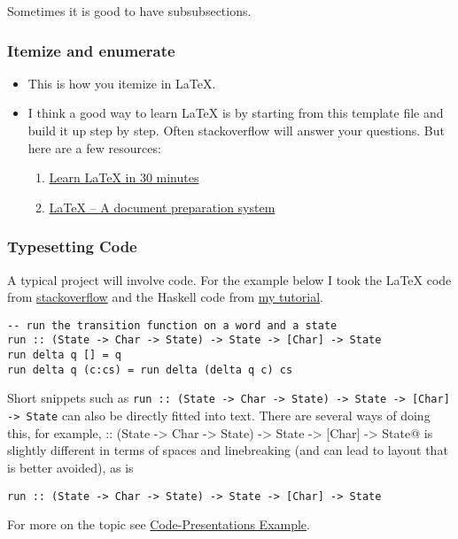 \documentclass{article}
\theoremstyle{theorem}
\theoremstyle{definition}
\theoremstyle{remark}
\begin{document}
Sometimes it is good to have subsubsections.

\subsubsection{Itemize and enumerate}

\begin{itemize}
\item This is how you itemize in LaTeX.
\item I think a good way to learn LaTeX is by starting from this template file and build it up step by step. Often stackoverflow will answer your questions. But here are a few resources:
  \begin{enumerate}
  \item \href{https://www.overleaf.com/learn/latex/Learn_LaTeX_in_30_minutes}{Learn LaTeX in 30 minutes}
  \item \href{https://www.latex-project.org/}{LaTeX – A document preparation system}\end{enumerate}
\end{itemize}

\subsubsection{Typesetting Code}

A typical project will involve code. For the example below I took the LaTeX code from \href{https://stackoverflow.com/a/3175141/4600290}{stackoverflow} and the Haskell code from \href{https://hackmd.io/@alexhkurz/HylLKujCP}{my tutorial}.

\begin{lstlisting}
-- run the transition function on a word and a state
run :: (State -> Char -> State) -> State -> [Char] -> State
run delta q [] = q
run delta q (c:cs) = run delta (delta q c) cs 
\end{lstlisting}
%
Short snippets such as \texttt{run :: (State -> Char -> State) -> State -> [Char] -> State} can also be directly fitted into text. There are several ways of doing this, for example, \verb@run :: (State -> Char -> State) -> State -> [Char] -> State@ is slightly different in terms of spaces and linebreaking (and can lead to layout that is better avoided), as is
\begin{verbatim}run :: (State -> Char -> State) -> State -> [Char] -> State\end{verbatim}

\noindent
For more on the topic see \href{https://www.overleaf.com/latex/examples/code-presentations-example-different-ways-shown-in-beamer-metropolis/tsxpnyjbhbds}{Code-Presentations Example}.
\end{document}
